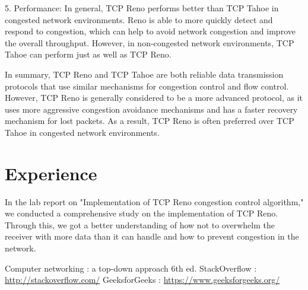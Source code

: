 \documentclass[11pt]{article}
\begin{document}
5. Performance: In general, TCP Reno performs better than TCP Tahoe in congested network environments. Reno is able to more quickly detect and respond to congestion, which can help to avoid network congestion and improve the overall throughput. However, in non-congested network environments, TCP Tahoe can perform just as well as TCP Reno.

In summary, TCP Reno and TCP Tahoe are both reliable data transmission protocols that use similar mechanisms for congestion control and flow control. However, TCP Reno is generally considered to be a more advanced protocol, as it uses more aggressive congestion avoidance mechanisms and has a faster recovery mechanism for lost packets. As a result, TCP Reno is often preferred over TCP Tahoe in congested network environments.


\section{Experience}
In the lab report on "Implementation of TCP Reno congestion control algorithm," we conducted a comprehensive study on the implementation of TCP Reno. Through this, we got a better understanding of how not to overwhelm the receiver with more data than it can handle and how to prevent congestion in the network. 



\begin{thebibliography}{1}
  Computer networking : a top-down approach 6th ed.
 StackOverflow : \url{http://stackoverflow.com/}
 GeeksforGeeks : \url{https://www.geeksforgeeks.org/}
\end{thebibliography}
\end{document}
